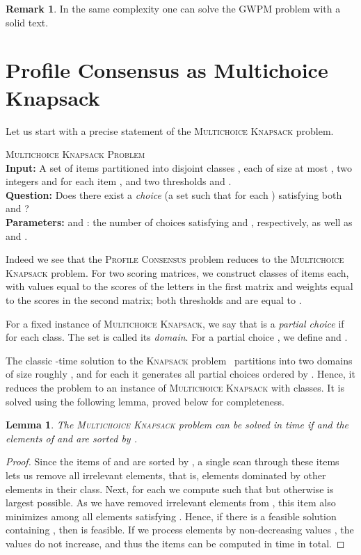\documentclass{article}
\theoremstyle{plain}
\newtheorem{lemma}[theorem]{Lemma}
\theoremstyle{definition}
\newtheorem{remark}[definition]{Remark}
\newenvironment{dsproblem}[1]
{\begin{center}\begin{lrbox}{\mybox}\begin{minipage}{0.96\columnwidth}#1 \textsc{Problem}\\}
{\end{minipage}\end{lrbox}\fbox{\usebox{\mybox}}\end{center}}
\newcommand{\defdsproblempar}[4]{
  \begin{dsproblem}{#1}
\textbf{Input:} #2\\
\textbf{Question:} #3\\
\textbf{Parameters:} #4
  \end{dsproblem}
  }
\newcommand{\MK}{\textsc{Multichoice Knapsack}\xspace}
\newcommand{\GWPM}{\textsc{GWPM}\xspace}
\newcommand{\PC}{\textsc{Profile Consensus}\xspace}
\newcommand{\Knapsack}{\textsc{Knapsack}\xspace}
\begin{document}
    \begin{remark}
      In the same complexity one can solve the \GWPM problem with a solid text.
    \end{remark}
    
    
 \section{Profile Consensus as Multichoice Knapsack}\label{sec:MK}
 Let us start with a precise statement of the \MK problem.
    \defdsproblempar{\MK}{
      A set  of  items partitioned into  disjoint classes , each of size at most ,
      two integers  and  for each item , and two thresholds  and .
    }{
      Does there exist a \emph{choice}  (a set  such that  for each )
      satisfying both
       and 
      ?
    }{
       and : the number of choices  satisfying 
      and , respectively, as well as  and .
    }

  Indeed we see that the \PC problem reduces to the \MK problem.
  For two  scoring matrices, we construct  classes of  items each,
  with values equal to the scores of the letters in the first matrix and weights equal to the scores in the second matrix;
  both thresholds  and  are equal to .
    
    For a fixed instance of \MK, we say that  is a \emph{partial choice} if  for each class.
    The set  is called its \emph{domain}.
    For a partial choice , we define  and .    
    
    
     The classic -time solution to the \Knapsack problem~\cite{DBLP:journals/jacm/HorowitzS74}
 partitions  into two domains  of size roughly ,
 and for each  it generates all partial choices  ordered by .
 Hence, it reduces the problem to an instance of \MK with  classes.
 It is solved using the following lemma, proved below for completeness.
  \begin{lemma}\label{lem:knap2}
    The \MK problem can be solved in  time if  and
    the elements  of  and  are sorted by .
  \end{lemma}
    \begin{proof}
      Since the items of  and  are sorted by , 
      a single scan through these items lets us remove all irrelevant elements, that is, elements dominated by other elements in their class.
      Next, for each  we compute  such that  but otherwise  is largest possible.
      As we have removed irrelevant elements from , this item also minimizes  among all elements satisfying .
      Hence, if there is a feasible solution containing , then  is feasible. 
      If we process elements  by non-decreasing values , the values  do not increase, and
      thus the items  can be computed in  time in total.
    \end{proof} 
\end{document}
